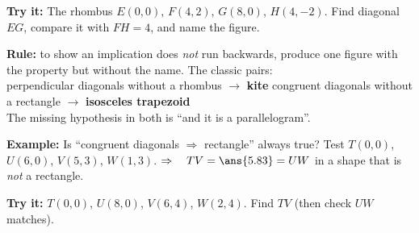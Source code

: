 \documentclass[12pt]{article}
\begin{document}
\begin{tryitbox}
\textbf{Try it:} The rhombus $E(0,0)$, $F(4,2)$, $G(8,0)$, $H(4,-2)$. Find diagonal $EG$, compare
it with $FH = 4$, and name the figure.\\[2pt]
\end{tryitbox}


\begin{formulabox}
\textbf{Rule:} to show an implication does \emph{not} run backwards, produce one figure with the
property but without the name. The classic pairs:\\[3pt]
perpendicular diagonals without a rhombus $\rightarrow$ \textbf{kite} \qquad congruent diagonals
without a rectangle $\rightarrow$ \textbf{isosceles trapezoid}\\[2pt]
The missing hypothesis in both is ``and it is a parallelogram''.
\end{formulabox}

\begin{examplebox}
\textbf{Example:} Is ``congruent diagonals $\Rightarrow$ rectangle'' always true? Test
$T(0,0)$, $U(6,0)$, $V(5,3)$, $W(1,3)$.
$\Rightarrow\quad TV = \ans{5.83} = UW$ in a shape that is \emph{not} a rectangle.
\end{examplebox}

\begin{tryitbox}
\textbf{Try it:} $T(0,0)$, $U(8,0)$, $V(6,4)$, $W(2,4)$. Find $TV$ (then check $UW$ matches).
\\[2pt]
\end{tryitbox}
\end{document}
